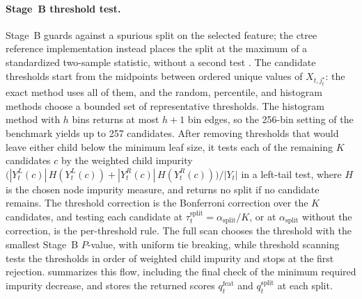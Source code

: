 \paragraph{Stage~B threshold test.}
Stage~B guards against a spurious split on the selected feature; the ctree
reference implementation instead places the split at the maximum of a
standardized two-sample statistic, without a second test
\citep{Hothorn2006UnbiasedRecursivePartitioning}. The candidate thresholds
start from the midpoints between ordered unique values of $X_{t,j_t^\star}$:
the exact method uses all of them, and the random, percentile, and histogram
methods choose a bounded set of representative thresholds. The histogram
method with $h$ bins returns at most $h+1$ bin edges, so the 256-bin setting of
the benchmark yields up to 257 candidates.
After removing thresholds that would leave either child below the minimum leaf
size, it tests each of the remaining $K$ candidates $c$ by the weighted child
impurity $\bigl(|Y_t^L(c)|\,H(Y_t^L(c)) + |Y_t^R(c)|\,H(Y_t^R(c))\bigr)/|Y_t|$
in a left-tail test, where $H$ is the chosen node impurity measure, and returns
no split if no candidate remains. The threshold correction is the Bonferroni
correction over the $K$ candidates, and testing each candidate at
$\tau_t^{\mathrm{split}}=\alpha_{\mathrm{split}}/K$, or at
$\alpha_{\mathrm{split}}$ without the correction, is the per-threshold rule. The
full scan chooses the threshold with the smallest Stage~B $P$-value, with
uniform tie breaking, while threshold scanning tests the thresholds in order of
weighted child impurity and stops at the first rejection. 
summarizes this flow, including the final check of the minimum required
impurity decrease, and stores the returned scores $q_t^{\mathrm{feat}}$ and
$q_t^{\mathrm{split}}$ at each split.

